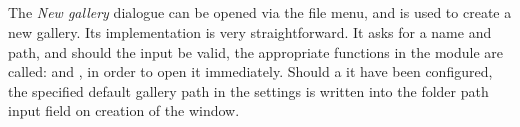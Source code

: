 \subsection{}
\def\kapitelautor{Erik Ritschl}

The \emph{New gallery} dialogue can be opened via the file menu, and is used to create a new gallery. Its implementation is very straightforward. It asks for a name and path, and should the input be valid, the appropriate functions in the  module are called:  and , in order to open it immediately. Should a it have been configured, the specified default gallery path in the settings is written into the folder path input field on creation of the window.